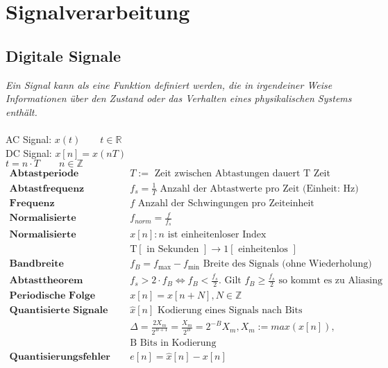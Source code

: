 \documentclass[8pt]{article}
\begin{document}
	\section{Signalverarbeitung}
		\subsection{Digitale Signale}
		\textit{Ein Signal kann als eine Funktion definiert werden,
die in irgendeiner Weise Informationen \"uber den Zustand
oder das Verhalten eines physikalischen Systems enth\"alt.}\\\\
		AC Signal: $x(t) \qquad t \in \mathbb{R}$\\
		DC Signal: $x[n] = x(nT)$\\
		$t = n \cdot T \qquad n \in \mathbb{Z}$\\
		\begin{align*}
			\textbf{Abtastperiode } & T := \text{ Zeit zwischen Abtastungen dauert T Zeit}\\
			\textbf{Abtastfrequenz } & f_s = \frac{1}{T} \text{ Anzahl der Abtastwerte pro Zeit (Einheit: Hz)}\\
			\textbf{Frequenz } & f \text{ Anzahl der Schwingungen pro Zeiteinheit}\\
			\textbf{Normalisierte Frequenz } & f_{norm} = \frac{f}{f_s}\\
			\textbf{Normalisierte Darstellung } & x[n]: n \text{ ist einheitenloser Index}\\
			& \text{T} [\text{ in Sekunden }] \rightarrow 1 [\text{ einheitenlos }]\\
			\textbf{Bandbreite } & f_B = f_\text{max} - f_\text{min}  \text{ Breite des Signals (ohne Wiederholung)}\\
			\textbf{Abtasttheorem } & f_s > 2 \cdot f_B \Leftrightarrow f_B < \frac{f_s}{2}. \text{ Gilt } f_B \geq \frac{f_s}{2} \text{ so kommt es zu Aliasing}\\
			\textbf{Periodische Folge } & x[n] = x[n + N], N \in \mathbb{Z}\\
			\textbf{Quantisierte Signale } & \hat{x}[n] \text{ Kodierung eines Signals nach Bits}\\
			& \Delta = \frac{2X_m}{2^{B+1}} = \frac{X_m}{2^B} = 2^{-B}X_m, X_m:= max(x[n]),\\
			& \text{B Bits in Kodierung}\\
			\textbf{Quantisierungsfehler } & e[n] = \hat{x}[n] - x[n]\\
		\end{align*}
\end{document}
